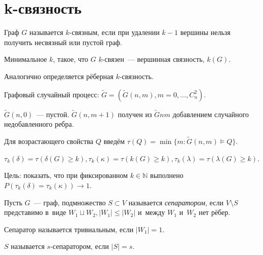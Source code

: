 \documentclass{article}
\begin{document}
\section{k-связность}

\begin{definition}
	Граф $G$ называется $k$-связным, если при удалении $k-1$ вершины нельзя получить несвязный или
	пустой граф.

	Минимальное $k$, такое, что $G$ $k$-связен~--- вершинная связность, $k(G)$.
\end{definition}

Аналогично определяется рёберная $k$-связность.

Графовый случайный процесс: $\tilde{G} = (\tilde{G}(n,m), m = 0, \ldots, C_n^2)$.

$\tilde{G}(n, 0)$~--- пустой. $\tilde{G}(n,m+1)$ получен из $\tilde{G}{n}{m}$ добавлением случайного
недобавленного ребра.

Для возрастающего свойства $Q$ введём $\tau(Q) = \min \{m: \tilde{G}(n, m) \models Q\}$.

$\tau_k(\delta) = \tau(\delta(G) \ge k), \tau_k(\kappa) = \tau(k(G) \ge k), \tau_k(\lambda) =
\tau(\lambda(G) \ge k)$.

Цель: показать, что при фиксированном $k \in \mathbb{N}$ выполнено $P(\tau_k(\delta) =
\tau_k(\kappa)) \rightarrow 1$.

\begin{definition}
	Пусть $G$~--- граф, подмножество $S \subset V$ называется \emph{сепаратором}, если $V \setminus S$
	представимо в~виде $W_1 \sqcup W_2, |W_1| \le |W_2|$ и~между $W_1$ и~$W_2$ нет рёбер.

	Сепаратор называется тривиальным, если $|W_1| = 1$.

	$S$ называется $s$-сепаратором, если $|S| = s$.
\end{definition}
\end{document}
